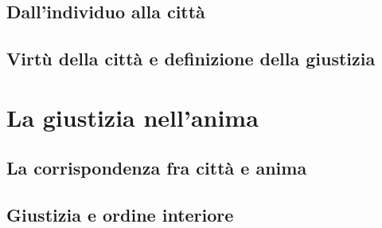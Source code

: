 \subsection{Dall'individuo alla città}

\subsection{Virtù della città e definizione della giustizia}

\section{La giustizia nell'anima}

\subsection{La corrispondenza fra città e anima}

\subsection{Giustizia e ordine interiore}
